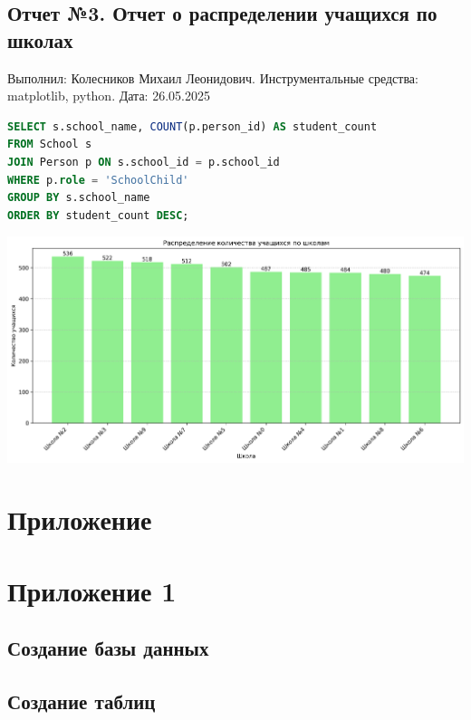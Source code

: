 \documentclass[a4paper]{article}
\begin{document}
\subsection{Отчет №3. Отчет о распределении учащихся по школах}
Выполнил: Колесников Михаил Леонидович.
Инструментальные средства: matplotlib, python.
Дата: 26.05.2025

\begin{lstlisting}[language=SQL, frame=none, numbers=none, caption={3. Столбчатая диаграмма распределения учащихся по школам}]
SELECT s.school_name, COUNT(p.person_id) AS student_count
FROM School s
JOIN Person p ON s.school_id = p.school_id
WHERE p.role = 'SchoolChild'
GROUP BY s.school_name
ORDER BY student_count DESC;
            \end{lstlisting}
\includegraphics[width=14cm]{data/plots/students_per_school.png}
\newpage
\section{Приложение}
\section*{\hfill Приложение 1\hfill}
\subsection{Создание базы данных}
\label{subsec:db-create}


\subsection{Создание таблиц}
\label{subsec:table-create}

\end{document}
